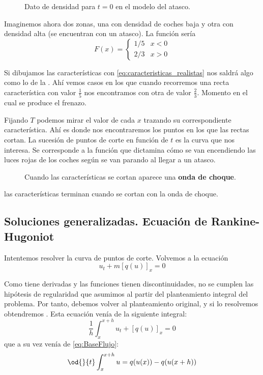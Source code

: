 		\begin{example}[Frenazo]
			\begin{wrapfigure}[10]{R}{0.4\textwidth}
				\centering
				\vspace{-10pt}
				\caption{Dato de densidad para $t=0$ en el modelo del atasco.}
				\label{fig:modeloAtasco}
			\end{wrapfigure}

			Imaginemos ahora dos zonas, una con densidad de coches baja y otra con densidad alta (se encuentran con un atasco). La función sería  \[
			F(x) =
			\begin{cases}
				1/5 & x < 0 \\
				2/3 & x > 0
			\end{cases}
			\]

			Si dibujamos las características con \eqref{eq:caracteristicas_realistas} nos saldrá algo como lo de la . Ahí vemos casos en los que cuando recorremos una recta característica con valor $\frac{1}{5}$ nos encontramos con otra de valor $\frac{2}{3}$. Momento en el cual se produce el frenazo.

			Fijando $T$ podemos mirar el valor de cada $x$ trazando su correspondiente característica. Ahí es donde nos encontraremos los puntos en los que las rectas cortan. La sucesión de puntos de corte en función de $t$ es la curva que nos interesa. Se corresponde a la función que dictamina cómo se van encendiendo las luces rojas de los coches según se van parando al llegar a un atasco.

			\begin{figure}[bhp]
				\centering
				\caption{Cuando las características se cortan aparece una {\bf onda de choque}.}
				\label{fig:ondaChoque}
			\end{figure}

			\obs las características terminan cuando se cortan con la onda de choque.

		\end{example}

		\subsection{Soluciones generalizadas. Ecuación de Rankine-Hugoniot}

		Intentemos resolver la curva de puntos de corte. Volvemos a la ecuación \[ u_t +m [q(u)]_x = 0 \]

		Como tiene derivadas y las funciones tienen discontinuidades, no se cumplen las hipótesis de regularidad que asumimos al partir del planteamiento integral del problema. Por tanto, debemos volver al planteamiento original, y si lo resolvemos obtendremos . Esta ecuación venía de la siguiente integral: \[
			\frac{1}{h} \int^{x+h}_{x} u_t + [q(u)]_x = 0
		\] que a su vez venía de \eqref{eq:BaseFlujo}: \[
			\od{}{t} \int^{x+h}_{x} u = q(u(x))-q(u(x+h))
		\]

